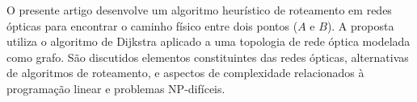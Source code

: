 \begin{resumo} 
  O presente artigo desenvolve um algoritmo heurístico de roteamento em redes
  ópticas para encontrar o caminho físico entre dois pontos ($A$ e $B$). A proposta
  utiliza o algoritmo de Dijkstra aplicado a uma topologia de rede óptica
  modelada como grafo. São discutidos elementos constituintes das redes
  ópticas, alternativas de algoritmos de roteamento, e aspectos de complexidade
  relacionados à programação linear e problemas NP-difíceis.
\end{resumo}
